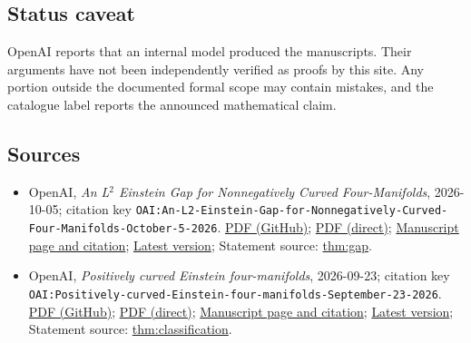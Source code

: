 \documentclass[11pt]{article}
\begin{document}
\subsection{Status caveat}
OpenAI reports that an internal model produced the manuscripts. Their arguments have not been independently verified as proofs by this site. Any portion outside the documented formal scope may contain mistakes, and the catalogue label reports the announced mathematical claim.

\subsection{Sources}
\begin{itemize}
\item OpenAI, \emph{An L\({}^{2}\) Einstein Gap for Nonnegatively Curved Four-Manifolds}, 2026-10-05; citation key \texttt{OAI:An-L2-Einstein-Gap-for-Nonnegatively-Curved-Four-Manifolds-October-5-2026}. \href{https://github.com/openai/math/blob/adc7f1241b42e322a6451854ab7e4b4c146bf78a/preprints/An-L2-Einstein-Gap-for-Nonnegatively-Curved-Four-Manifolds-October-5-2026/einstein-gap.pdf}{PDF (GitHub)}; \href{https://github.com/openai/math/raw/adc7f1241b42e322a6451854ab7e4b4c146bf78a/preprints/An-L2-Einstein-Gap-for-Nonnegatively-Curved-Four-Manifolds-October-5-2026/einstein-gap.pdf}{PDF (direct)}; \href{https://github.com/openai/math/blob/adc7f1241b42e322a6451854ab7e4b4c146bf78a/preprints/An-L2-Einstein-Gap-for-Nonnegatively-Curved-Four-Manifolds-October-5-2026/README.md}{Manuscript page and citation}; \href{https://github.com/openai/math/blob/main/preprints/An-L2-Einstein-Gap-for-Nonnegatively-Curved-Four-Manifolds-October-5-2026/einstein-gap.pdf}{Latest version}; Statement source: \href{https://github.com/openai/math/blob/adc7f1241b42e322a6451854ab7e4b4c146bf78a/preprints/An-L2-Einstein-Gap-for-Nonnegatively-Curved-Four-Manifolds-October-5-2026/build/source/main.tex\#L88}{thm:gap}.
\item OpenAI, \emph{Positively curved Einstein four-manifolds}, 2026-09-23; citation key \texttt{OAI:Positively-curved-Einstein-four-manifolds-September-23-2026}. \href{https://github.com/openai/math/blob/adc7f1241b42e322a6451854ab7e4b4c146bf78a/preprints/Positively-curved-Einstein-four-manifolds-September-23-2026/paper.pdf}{PDF (GitHub)}; \href{https://github.com/openai/math/raw/adc7f1241b42e322a6451854ab7e4b4c146bf78a/preprints/Positively-curved-Einstein-four-manifolds-September-23-2026/paper.pdf}{PDF (direct)}; \href{https://github.com/openai/math/blob/adc7f1241b42e322a6451854ab7e4b4c146bf78a/preprints/Positively-curved-Einstein-four-manifolds-September-23-2026/README.md}{Manuscript page and citation}; \href{https://github.com/openai/math/blob/main/preprints/Positively-curved-Einstein-four-manifolds-September-23-2026/paper.pdf}{Latest version}; Statement source: \href{https://github.com/openai/math/blob/adc7f1241b42e322a6451854ab7e4b4c146bf78a/preprints/Positively-curved-Einstein-four-manifolds-September-23-2026/build/sections/01-introduction.tex\#L13}{thm:classification}.

\end{itemize}
\end{document}
